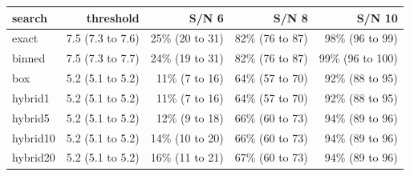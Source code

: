 \begin{tabular}{lrrrr}
\toprule
search & threshold & S/N 6 & S/N 8 & S/N 10 \\
\midrule
exact & 7.5 (7.3 to 7.6) & 25\% (20 to 31) & 82\% (76 to 87) & 98\% (96 to 99) \\
binned & 7.5 (7.3 to 7.7) & 24\% (19 to 31) & 82\% (76 to 87) & 99\% (96 to 100) \\
box & 5.2 (5.1 to 5.2) & 11\% (7 to 16) & 64\% (57 to 70) & 92\% (88 to 95) \\
hybrid1 & 5.2 (5.1 to 5.2) & 11\% (7 to 16) & 64\% (57 to 70) & 92\% (88 to 95) \\
hybrid5 & 5.2 (5.1 to 5.2) & 12\% (9 to 18) & 66\% (60 to 73) & 94\% (89 to 96) \\
hybrid10 & 5.2 (5.1 to 5.2) & 14\% (10 to 20) & 66\% (60 to 73) & 94\% (89 to 96) \\
hybrid20 & 5.2 (5.1 to 5.2) & 16\% (11 to 21) & 67\% (60 to 73) & 94\% (89 to 96) \\
\bottomrule
\end{tabular}
